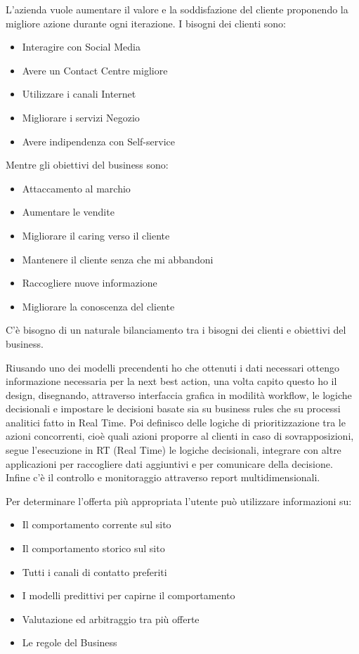 \documentclass[11pt]{article}
\newenvironment{nosepitemize}{\begin{itemize}[noitemsep,topsep=0ex]}{\end{itemize}}
\begin{document}
L'azienda vuole aumentare il valore e la soddisfazione del cliente proponendo la migliore azione durante ogni iterazione. I bisogni dei clienti sono:
\begin{nosepitemize}
	\item Interagire con Social Media
	\item Avere un Contact Centre migliore
	\item Utilizzare i canali Internet
	\item Migliorare i servizi Negozio
	\item Avere indipendenza con Self-service
\end{nosepitemize}
Mentre gli obiettivi del business sono:
\begin{nosepitemize}
	\item Attaccamento al marchio
	\item Aumentare le vendite
	\item Migliorare il caring verso il cliente
	\item Mantenere il cliente senza che mi abbandoni
	\item Raccogliere nuove informazione
	\item Migliorare la conoscenza del cliente
\end{nosepitemize}
C'è bisogno di un naturale bilanciamento tra i bisogni dei clienti e obiettivi del business.

Riusando uno dei modelli precendenti ho che ottenuti i dati necessari ottengo informazione necessaria per la next best action, una volta capito questo ho il design, disegnando, attraverso interfaccia grafica in modilità workflow, le logiche decisionali e impostare le decisioni basate sia su business rules che su processi analitici fatto in Real Time.
Poi definisco delle logiche di prioritizzazione tra le azioni concorrenti, cioè quali azioni proporre al clienti in caso di sovrapposizioni,
segue l'esecuzione in RT (Real Time) le logiche decisionali, integrare con altre applicazioni per raccogliere dati aggiuntivi e per comunicare della decisione.
Infine c'è il controllo e monitoraggio attraverso report multidimensionali.

Per determinare l'offerta più appropriata l'utente può utilizzare informazioni su:
\begin{nosepitemize}
	\item Il comportamento corrente sul sito
	\item Il comportamento storico sul sito
	\item Tutti i canali di contatto preferiti
	\item I modelli predittivi per capirne il comportamento
	\item Valutazione ed arbitraggio tra più offerte
	\item Le regole del Business
\end{nosepitemize}
\end{document}

